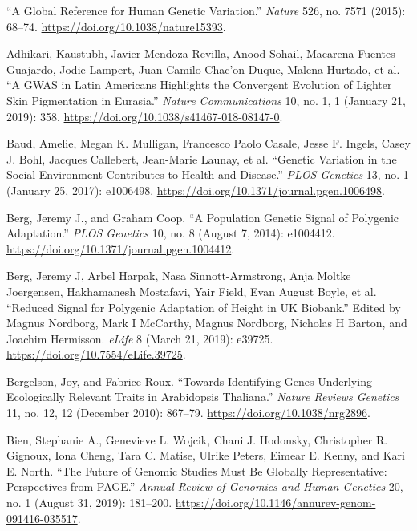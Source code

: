\documentclass[
]{book}
\newlength{\cslhangindent}
\newlength{\cslentryspacingunit} %
\newenvironment{CSLReferences}[2] %
 {%
  \setlength{\parindent}{0pt}
  \ifodd #1
  \let\oldpar\par
  \def\par{\hangindent=\cslhangindent\oldpar}
  \fi
  \setlength{\parskip}{#2\cslentryspacingunit}
 }%
 {}
\begin{document}
\hypertarget{refs}{}
\begin{CSLReferences}{1}{0}
\leavevmode{}%
{``A Global Reference for Human Genetic Variation.''} \emph{Nature} 526, no. 7571 (2015): 68--74. \url{https://doi.org/10.1038/nature15393}.

\leavevmode{}%
Adhikari, Kaustubh, Javier Mendoza-Revilla, Anood Sohail, Macarena Fuentes-Guajardo, Jodie Lampert, Juan Camilo Chac'on-Duque, Malena Hurtado, et al. {``A {GWAS} in {Latin Americans} Highlights the Convergent Evolution of Lighter Skin Pigmentation in {Eurasia}.''} \emph{Nature Communications} 10, no. 1, 1 (January 21, 2019): 358. \url{https://doi.org/10.1038/s41467-018-08147-0}.

\leavevmode{}%
Baud, Amelie, Megan K. Mulligan, Francesco Paolo Casale, Jesse F. Ingels, Casey J. Bohl, Jacques Callebert, Jean-Marie Launay, et al. {``Genetic {Variation} in the {Social Environment Contributes} to {Health} and {Disease}.''} \emph{PLOS Genetics} 13, no. 1 (January 25, 2017): e1006498. \url{https://doi.org/10.1371/journal.pgen.1006498}.

\leavevmode{}%
Berg, Jeremy J., and Graham Coop. {``A {Population Genetic Signal} of {Polygenic Adaptation}.''} \emph{PLOS Genetics} 10, no. 8 (August 7, 2014): e1004412. \url{https://doi.org/10.1371/journal.pgen.1004412}.

\leavevmode{}%
Berg, Jeremy J, Arbel Harpak, Nasa Sinnott-Armstrong, Anja Moltke Joergensen, Hakhamanesh Mostafavi, Yair Field, Evan August Boyle, et al. {``Reduced Signal for Polygenic Adaptation of Height in {UK Biobank}.''} Edited by Magnus Nordborg, Mark I McCarthy, Magnus Nordborg, Nicholas H Barton, and Joachim Hermisson. \emph{eLife} 8 (March 21, 2019): e39725. \url{https://doi.org/10.7554/eLife.39725}.

\leavevmode{}%
Bergelson, Joy, and Fabrice Roux. {``Towards Identifying Genes Underlying Ecologically Relevant Traits in {Arabidopsis} Thaliana.''} \emph{Nature Reviews Genetics} 11, no. 12, 12 (December 2010): 867--79. \url{https://doi.org/10.1038/nrg2896}.

\leavevmode{}%
Bien, Stephanie A., Genevieve L. Wojcik, Chani J. Hodonsky, Christopher R. Gignoux, Iona Cheng, Tara C. Matise, Ulrike Peters, Eimear E. Kenny, and Kari E. North. {``The {Future} of {Genomic Studies Must Be Globally Representative}: {Perspectives} from {PAGE}.''} \emph{Annual Review of Genomics and Human Genetics} 20, no. 1 (August 31, 2019): 181--200. \url{https://doi.org/10.1146/annurev-genom-091416-035517}.


\end{CSLReferences}
\end{document}
